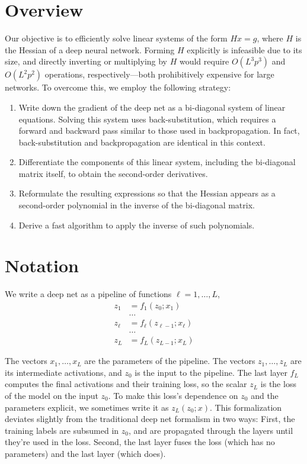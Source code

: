 \documentclass{article}
\begin{document}
\section{Overview}

Our objective is to efficiently solve linear systems of the form $H x = g$,
where $H$ is the Hessian of a deep neural network. Forming $H$ explicitly is
infeasible due to its size, and directly inverting or multiplying by $H$ would
require $O(L^3p^3)$ and $O(L^2p^2)$ operations, respectively---both
prohibitively expensive for large networks. To overcome this, we employ the
following strategy:
\begin{enumerate}
    \item
          Write down the gradient of the deep net as a bi-diagonal system of linear
          equations. Solving this system uses back-substitution, which requires a forward
          and backward pass similar to those used in backpropagation. In fact,
          back-substitution and backpropagation are identical in this context.
    \item
          Differentiate the components of this linear system, including the bi-diagonal
          matrix itself, to obtain the second-order derivatives.
    \item
          Reformulate the resulting expressions so that the Hessian appears as a
          second-order polynomial in the inverse of the bi-diagonal matrix.
    \item
          Derive a fast algorithm to apply the inverse of such polynomials.
\end{enumerate}

\section{Notation}

We write a deep net as a pipeline of functions $\ell = 1, \ldots, L$,
\begin{align}
    z_1    & = f_1(z_0; x_1) \nonumber              \\
           & \ldots \nonumber                       \\
    z_\ell & = f_\ell(z_{\ell-1}; x_\ell) \nonumber \\
           & \ldots \nonumber                       \\
    z_L    & = f_L(z_{L-1}; x_L)
\end{align}

The vectors $x_1,\ldots, x_L$ are the parameters of the pipeline. The vectors
$z_1,\ldots, z_L$ are its intermediate activations, and $z_0$ is the input to
the pipeline. The last layer $f_L$ computes the final activations and their
training loss, so the scalar $z_L$ is the loss of the model on the input $z_0$.
To make this loss's dependence on $z_0$ and the parameters explicit, we
sometimes write it as $z_L(z_0;x)$. This formalization deviates slightly from
the traditional deep net formalism in two ways: First, the training labels are
subsumed in $z_0$, and are propagated through the layers until they're used in
the loss. Second, the last layer fuses the loss (which has no parameters) and
the last layer (which does).
\end{document}
